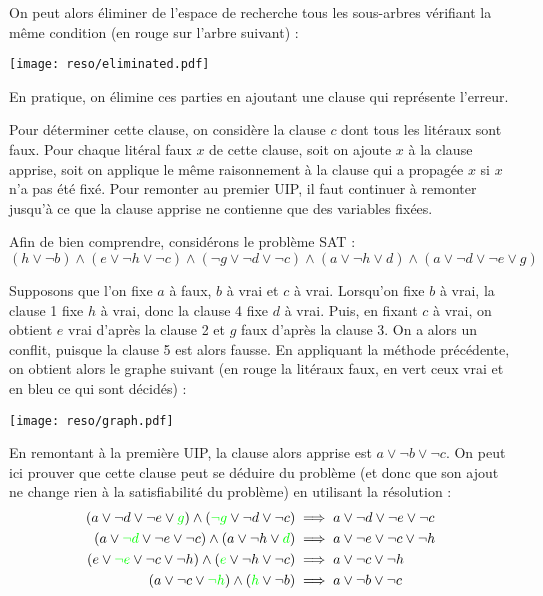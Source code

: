 On peut alors éliminer de l'espace de recherche tous les sous-arbres vérifiant
la même condition (en rouge sur l'arbre suivant) :
\begin{center}
\texttt{[image: reso/eliminated.pdf]}
\end{center}

En pratique, on élimine ces parties en ajoutant une clause qui représente
l'erreur.

Pour déterminer cette clause, on considère la clause $c$ dont tous les litéraux
sont faux. Pour chaque litéral faux $x$ de cette clause, soit on ajoute $x$ à
la clause apprise, soit on applique le même raisonnement à la clause qui a
propagée $x$ si $x$ n'a pas été fixé. Pour remonter au premier UIP, il faut
continuer à remonter jusqu'à ce que la clause apprise ne contienne que des
variables fixées.

Afin de bien comprendre, considérons le problème SAT :
\[ (h\vee\neg b) \wedge (e\vee\neg h\vee\neg c)
   \wedge (\neg g\vee\neg d\vee\neg c) \wedge (a\vee\neg h\vee d)
   \wedge (a\vee\neg d\vee\neg e\vee g)\]

Supposons que l'on fixe $a$ à faux, $b$ à vrai et $c$ à vrai. Lorsqu'on fixe
$b$ à vrai, la clause 1 fixe $h$ à vrai, donc la clause 4 fixe $d$ à vrai.
Puis, en fixant $c$ à vrai, on obtient $e$ vrai d'après la clause 2 et $g$
faux d'après la clause 3. On a alors un conflit, puisque la clause 5 est alors
fausse. En appliquant la méthode précédente, on obtient alors le graphe
suivant (en rouge la litéraux faux, en vert ceux vrai et en bleu ce qui sont
décidés) :
\begin{center}
\texttt{[image: reso/graph.pdf]}
\end{center}

En remontant à la première UIP, la clause alors apprise est
$a\vee\neg b\vee\neg c$. On peut ici prouver que cette clause peut se déduire
du problème (et donc que son ajout ne change rien à la satisfiabilité du
problème) en utilisant la résolution :
\begin{align*}
    (a\vee\neg d\vee\neg e\vee {\color{green}g})
    \wedge({\color{green}\neg g}\vee\neg d\vee\neg c)
        &\implies a\vee\neg d\vee\neg e\vee\neg c \\
    (a\vee{\color{green}\neg d}\vee\neg e\vee\neg c)
    \wedge(a\vee\neg h\vee{\color{green} d})
        &\implies a\vee\neg e\vee\neg c\vee\neg h \\
    (e\vee{\color{green}\neg e}\vee\neg c\vee\neg h)
    \wedge({\color{green}e}\vee\neg h\vee\neg c)
        &\implies a\vee\neg c\vee\neg h \\
    (a\vee\neg c\vee{\color{green}\neg h})\wedge({\color{green} h}\vee\neg b)
        &\implies a\vee\neg b\vee\neg c\\
\end{align*}

